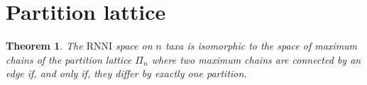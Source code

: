 \documentclass[11pt, a4paper]{article}
\newcommand{\rnni}{\mathrm{RNNI}}
\newtheorem{theorem}[definition]{Theorem}
\begin{document}
\section{Partition lattice}


\begin{theorem}
	The $\rnni$ space on $n$ taxa is isomorphic to the space of maximum chains of the partition lattice $\Pi_n$ where two maximum chains are connected by an edge if, and only if, they differ by exactly one partition.
\end{theorem}



\end{document}
